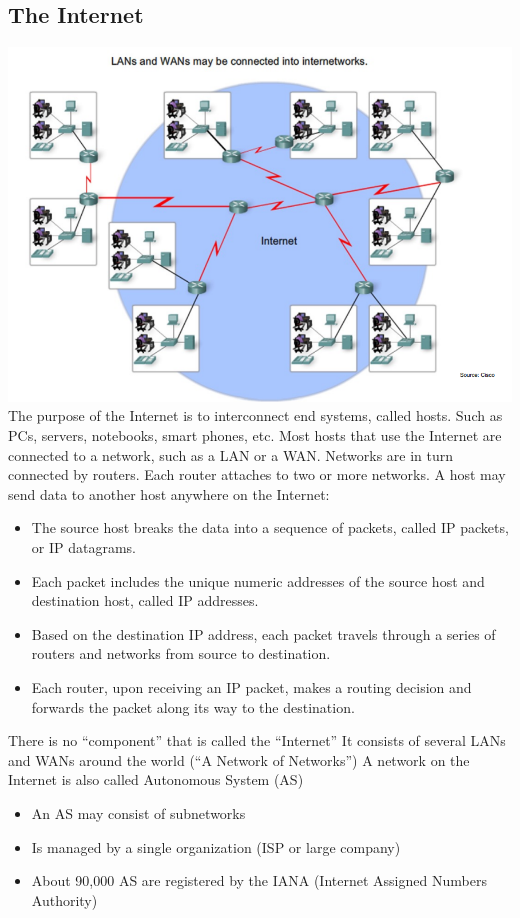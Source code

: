 \documentclass[11pt]{article}
\begin{document}
\subsection{The Internet}
\includegraphics[width=\textwidth]{the-internet}
The purpose of the Internet is to interconnect end systems, called hosts. 
Such as PCs, servers, notebooks, smart phones, etc.
Most hosts that use the Internet are connected to a network, such as a LAN or a WAN.\@
Networks are in turn connected by routers. Each router attaches to two or more networks.
A host may send data to another host anywhere on the Internet:
    \begin{itemize}
        \item The source host breaks the data into a sequence of packets, called IP packets, or IP datagrams.
        \item Each packet includes the unique numeric addresses of the source host and destination host, called IP addresses.
        \item Based on the destination IP address, each packet travels through a series of routers and networks from source to destination.
        \item Each router, upon receiving an IP packet, makes a routing decision and forwards the packet along its way to the destination.
    \end{itemize}
    There is no “component” that is called the “Internet”
    It consists of several LANs and WANs around the world (“A Network of Networks”)
    A network on the Internet is also called Autonomous System (AS)
    \begin{itemize}
        \item An AS may consist of subnetworks
        \item Is managed by a single organization (ISP or large company)
        \item About 90,000 AS are registered by the IANA (Internet Assigned Numbers Authority)
    \end{itemize}
\end{document}
